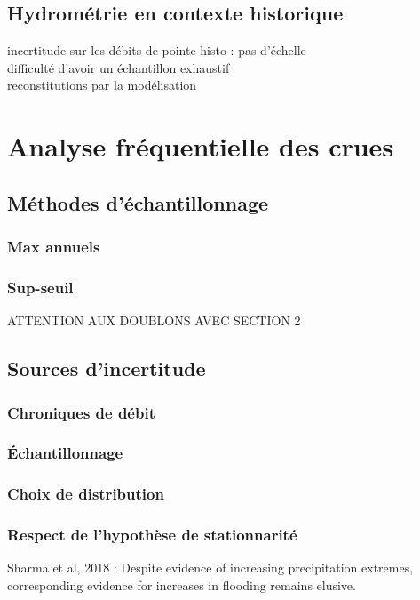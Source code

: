 \documentclass[11pt]{article}
\begin{document}
		\subsection{Hydrométrie en contexte historique}
		incertitude sur les débits de pointe histo : pas d'échelle\\
		difficulté d'avoir un échantillon exhaustif\\
		reconstitutions par la modélisation\\
	
		
\section{Analyse fréquentielle des crues}
		\subsection{Méthodes d'échantillonnage}
			\subsubsection{Max annuels}
			\subsubsection{Sup-seuil}
			
			ATTENTION AUX DOUBLONS AVEC SECTION 2
		\subsection{Sources d'incertitude}
			\subsubsection{Chroniques de débit}
			\subsubsection{Échantillonnage}
			\subsubsection{Choix de distribution}
			\subsubsection{Respect de l'hypothèse de stationnarité}
			
Sharma et al, 2018 : Despite evidence of increasing precipitation extremes, corresponding evidence for increases in flooding remains elusive. 
		
\end{document}

